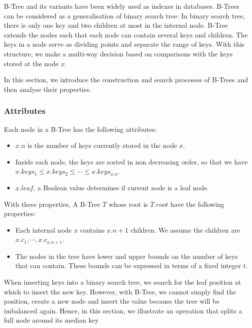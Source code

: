B-Tree and its variants have been widely used as indexes in databases. B-Trees can be considered as a generalisation of binary search tree: In binary search tree, there is only one key and two children at most in the internal node. B-Tree extends the nodes such that each node can contain several keys and children. The keys in a node serve as dividing points and separate the range of keys. With this structure, we make a multi-way decision based on comparisons with the keys stored at the node $x$.

In this section, we introduce the construction and search processes
of B-Trees and then analyse their properties.

\subsubsection{Attributes}

Each node in a B-Tree has the following attributes:

\begin{itemize}
\item
  $x.n$ is the number of keys currently stored in the node $x$.
\item
  Inside each node, the keys are sorted in non decreasing order, so that
  we have $x.keys_1\leq x.keys_2\leq\cdots\leq x.keys_{x.n}$.
\item
  $x.leaf$, a Boolean value determines if current node is a leaf node.
\end{itemize}

With these properties, A B-Tree $T$ whose root is $T.root$ have the
following properties:

\begin{itemize}
\item
  Each internal node $x$ contains $x.n+1$ children. We assume the
  children are $x.c_1,\cdots,x.c_{x.n+1}$.
\item
  The nodes in the tree have lower and upper bounds on the number of
  keys that can contain. These bounds can be expressed in terms of a
  fixed integer $t$.
\end{itemize}

When inserting keys into a binary search tree, we search for the leaf
position at which to insert the new key. However, with B-Tree, we cannot
simply find the position, create a new node and insert the value because
the tree will be imbalanced again. Hence, in this section, we illustrate
an operation that splits a full node around its median key

